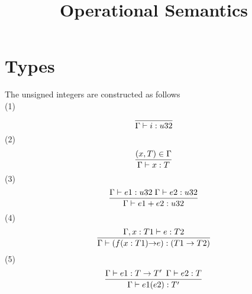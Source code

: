 \documentclass[a4paper, 12pt]{report}
\title{\Large{Operational Semantics}}
\begin{document}
\maketitle

\section{Types}

The unsigned integers are constructed as follows
$$
{}
$$
(1)
$$
{{}\over{{\Gamma}\vdash {i: u32}}}
$$
(2)
$$
{{(x,T)\in{\Gamma}}
\over
{{\Gamma}\vdash {x : T}}}
$$
(3)
$$
{{{\Gamma}\vdash {e1: u32}{\;}{\Gamma}\vdash {e2: u32}}
\over
{{\Gamma}\vdash {e1 + e2: u32}}}
$$
(4)
$$
{{{\Gamma}{,x:T1}\vdash {e: T2}}
\over
{{\Gamma}\vdash {(f(x:T1){\rightarrow} e) : (T1 \rightarrow T2)}}}
$$
(5)
$$
{{{\Gamma}\vdash{e1 : T \rightarrow T'}{\;\:}{\Gamma}\vdash {e2: T}}
\over
{{\Gamma}\vdash{e1(e2) : T'}}}
$$
\end{document}
